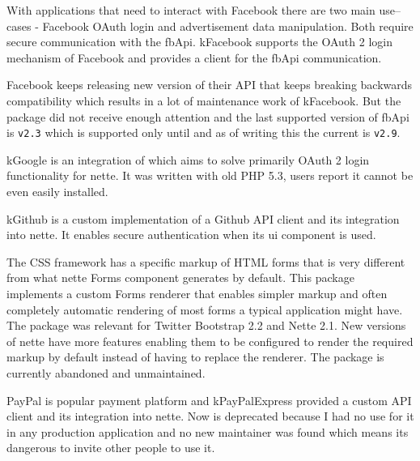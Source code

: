  \label{sec:state:facebook}

With applications that need to interact with Facebook there are two main use--cases - Facebook OAuth login and advertisement data manipulation. Both require secure communication with the \gls{fbApi}. \gls{kFacebook} supports the OAuth 2 login mechanism of Facebook and provides a client for the \gls{fbApi} communication.

Facebook keeps releasing new version of their API that keeps breaking backwards compatibility which results in a lot of maintenance work of \gls{kFacebook}. But the package did not receive enough attention and the last supported version of \gls{fbApi} is \lstinline{v2.3} which is supported only until  and as of writing this the current  is \lstinline{v2.9}.

 \label{sec:state:google}

\gls{kGoogle} is an integration of  which aims to solve primarily OAuth 2 login functionality for \gls{nette}. It was written with old PHP 5.3, users report it cannot be even easily installed.

 \label{sec:state:github}

\gls{kGithub} is a custom implementation of a Github API client and its integration into \gls{nette}. It enables secure authentication when its \gls{ui} component is used.

 \label{sec:state:bootstrap-form-renderer}

The CSS framework  has a specific markup of HTML forms that is very different from what \gls{nette} Forms component generates by default. This package implements a custom Forms renderer that enables simpler markup and often completely automatic rendering of most forms a typical application might have. The package was relevant for Twitter Bootstrap 2.2 and Nette 2.1. New versions of \gls{nette} have more features enabling them to be configured to render the required markup by default instead of having to replace the renderer. The package is currently abandoned and unmaintained.

 \label{sec:state:paypal-express}

PayPal is popular payment platform and \gls{kPayPalExpress} provided a custom API client and its integration into \gls{nette}. Now is deprecated because I had no use for it in any production application and no new maintainer was found which means its dangerous to invite other people to use it.

